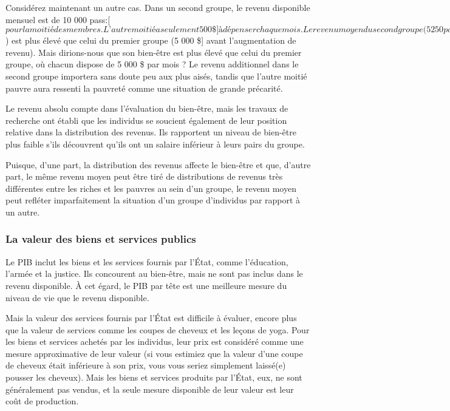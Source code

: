 \documentclass[11pt]{amsart}
\begin{document}
Considérez maintenant un autre cas. Dans un second groupe, le revenu disponible mensuel est de 10 000 pass:[$ pour la moitié des membres. L’autre moitié a seulement 500 \$] à dépenser chaque mois. Le revenu moyen du second groupe (5 250 pass:[$) est plus élevé que celui du premier groupe (5 000 \$] avant l’augmentation de revenu). Mais dirions-nous que son bien-être est plus élevé que celui du premier groupe, où chacun dispose de 5 000 \$ par mois ? Le revenu additionnel dans le second groupe importera sans doute peu aux plus aisés, tandis que l’autre moitié pauvre aura ressenti la pauvreté comme une situation de grande précarité.


Le revenu absolu compte dans l’évaluation du bien-être, mais les travaux de recherche ont établi que les individus se soucient également de leur position relative dans la distribution des revenus. Ils rapportent un niveau de bien-être plus faible s’ils découvrent qu’ils ont un salaire inférieur à leurs pairs du groupe.


Puisque, d’une part, la distribution des revenus affecte le bien-être et que, d’autre part, le même revenu moyen peut être tiré de distributions de revenus très différentes entre les riches et les pauvres au sein d’un groupe, le revenu moyen peut refléter imparfaitement la situation d’un groupe d’individus par rapport à un autre.


\hypertarget{x-la-valeur-des-biens-et-services-publics}{\subsubsection*{La valeur des biens et services publics}}
Le PIB inclut les biens et les services fournis par l’État, comme l’éducation, l’armée et la justice. Ils concourent au bien-être, mais ne sont pas inclus dans le revenu disponible. À cet égard, le PIB par tête est une meilleure mesure du niveau de vie que le revenu disponible.


Mais la valeur des services fournis par l’État est difficile à évaluer, encore plus que la valeur de services comme les coupes de cheveux et les leçons de yoga. Pour les biens et services achetés par les individus, leur prix est considéré comme une mesure approximative de leur valeur (si vous estimiez que la valeur d’une coupe de cheveux était inférieure à son prix, vous vous seriez simplement laissé(e) pousser les cheveux). Mais les biens et services produits par l’État, eux, ne sont généralement pas vendus, et la seule mesure disponible de leur valeur est leur coût de production.
\end{document}
